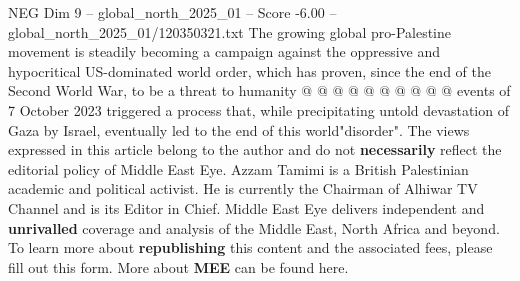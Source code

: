 \begin{textsample}{NEG Dim 9 – global\_north\_2025\_01 – Score -6.00 – global\_north\_2025\_01/120350321.txt}
The growing global pro-Palestine movement is steadily becoming a campaign against the oppressive and hypocritical US-dominated world order, which has proven, since the end of the Second World War, to be a threat to humanity @ @ @ @ @ @ @ @ @ @ events of 7 October 2023 triggered a process that, while precipitating untold devastation of Gaza by Israel, eventually led to the end of this world"disorder".
The views expressed in this article belong to the author and do not \textbf{necessarily} reflect the editorial policy of Middle East Eye.
Azzam Tamimi is a British Palestinian academic and political activist.
He is currently the Chairman of Alhiwar TV Channel and is its Editor in Chief.
Middle East Eye delivers independent and \textbf{unrivalled} coverage and analysis of the Middle East, North Africa and beyond.
To learn more about \textbf{republishing} this content and the associated fees, please fill out this form.
More about \textbf{MEE} can be found here.

\end{textsample}
